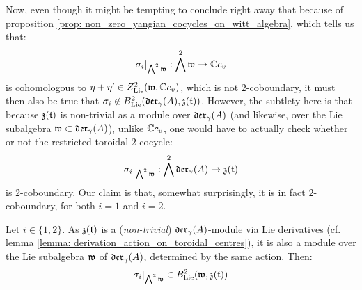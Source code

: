         Now, even though it might be tempting to conclude right away that because of proposition \ref{prop: non_zero_yangian_cocycles_on_witt_algebra}, which tells us that:
            $$\sigma_i|_{\bigwedge^2 \mathfrak{w}}: \bigwedge^2 \mathfrak{w} \to \mathbb{C} c_v$$
        is cohomologous to $\eta + \eta' \in Z^2_{\mathrm{Lie}}(\mathfrak{w}, \mathbb{C} c_v)$, which is not $2$-coboundary, it must then also be true that $\sigma_i \not \in B^2_{\mathrm{Lie}}(\mathfrak{der}_{\gamma}(A), \mathfrak{z}(\mathfrak{t}))$. However, the subtlety here is that because $\mathfrak{z}(\mathfrak{t})$ is non-trivial as a module over $\mathfrak{der}_{\gamma}(A)$ (and likewise, over the Lie subalgebra $\mathfrak{w} \subset \mathfrak{der}_{\gamma}(A)$), unlike $\mathbb{C} c_v$, one would have to actually check whether or not the restricted toroidal $2$-cocycle:
            $$\sigma_i|_{\bigwedge^2 \mathfrak{w}}: \bigwedge^2 \mathfrak{der}_{\gamma}(A) \to \mathfrak{z}(\mathfrak{t})$$
        is $2$-coboundary. Our claim is that, somewhat surprisingly, it is in fact $2$-coboundary, for both $i = 1$ and $i = 2$.
        \begin{proposition} \label{prop: non_trivial_yangian_restricted_coboundaries_examples}
            Let $i \in \{1, 2\}$. As $\mathfrak{z}(\mathfrak{t})$ is a (\textit{non-trivial}) $\mathfrak{der}_{\gamma}(A)$-module via Lie derivatives (cf. lemma \ref{lemma: derivation_action_on_toroidal_centres}), it is also a module over the Lie subalgebra $\mathfrak{w}$ of $\mathfrak{der}_{\gamma}(A)$, determined by the same action. Then:
                $$\sigma_i|_{ \bigwedge^2 \mathfrak{w} } \in B^2_{\mathrm{Lie}}(\mathfrak{w}, \mathfrak{z}(\mathfrak{t}))$$
        \end{proposition}

